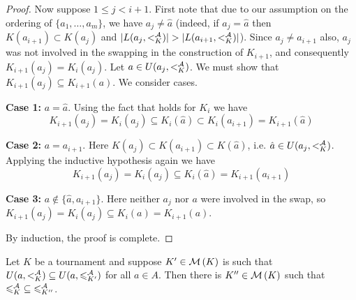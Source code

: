 \begin{proof}
    Now suppose $1 \le j < i + 1$. First note that due to our assumption on the
    ordering of $\{a_1,\ldots,a_m\}$, we have $a_j \ne \hat{a}$ (indeed, if
    $a_j = \hat{a}$ then $K(a_{i+1}) \subset K(a_j)$ and $|L(a_j, {<^{\mathcal{A}}_K})| >
    |L(a_{i+1}, {<^{\mathcal{A}}_K})|$). Since $a_j \ne a_{i+1}$ also, $a_j$ was not
    involved in the swapping in the construction of $K_{i+1}$, and consequently
    $K_{i+1}(a_j) = K_i(a_j)$. Let $a \in U(a_j, {<^{\mathcal{A}}_K})$. We must show that
    $K_{i+1}(a_j) \subseteq K_{i+1}(a)$. We consider cases.

    \textbf{Case 1:} $a = \hat{a}$. Using the fact that
     holds for $K_i$ we have
    \[
        K_{i+1}(a_j)
        = K_i(a_j)
        \subseteq K_i(\hat{a})
        \subset K_i(a_{i+1})
        = K_{i+1}(\hat{a})
    \]

    \textbf{Case 2:} $a = a_{i+1}$. Here $K(a_j) \subset K(a_{i+1}) \subset
    K(\hat{a})$, i.e. $\hat{a} \in U(a_j, {<^{\mathcal{A}}_K})$. Applying the inductive
    hypothesis again we have
    \[
        K_{i+1}(a_j)
        = K_i(a_j)
        \subseteq K_i(\hat{a})
        = K_{i+1}(a_{i+1})
    \]

    \textbf{Case 3:} $a \notin \{\hat{a}, a_{i+1}\}$. Here neither $a_j$ nor
    $a$ were involved in the swap, so $K_{i+1}(a_j) = K_i(a_j) \subseteq K_i(a)
    = K_{i+1}(a)$.

    By induction, the proof is complete.
\end{proof}

\begin{lemma}
    \label{tourn_result_chainmin_mon_extend_full}
    Let $K$ be a tournament and suppose $K' \in \operatorname{\mathcal{M}}\left({K}\right)$ is such that $U(a,
    {<^{\mathcal{A}}_K}) \subseteq U(a, {\leqslant^{\mathcal{A}}_{K'}})$ for all $a \in A$. Then there is
    $K'' \in \operatorname{\mathcal{M}}\left({K}\right)$ such that ${\leqslant^{\mathcal{A}}_K} \subseteq {\leqslant^{\mathcal{A}}_{K''}}$.


\end{lemma}

